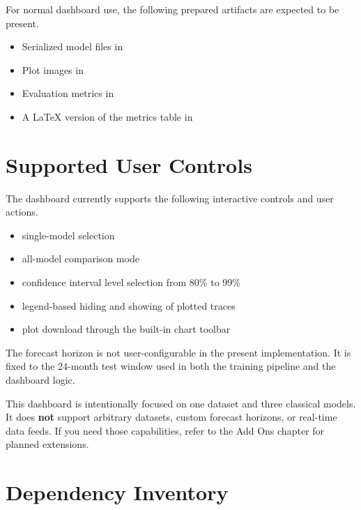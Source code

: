 For normal dashboard use, the following prepared artifacts are expected to be present.

\begin{itemize}
    \item Serialized model files in 
    \item Plot images in 
    \item Evaluation metrics in 
    \item A LaTeX version of the metrics table in 
\end{itemize}

\section{Supported User Controls}

The dashboard currently supports the following interactive controls and user actions.

\begin{itemize}
    \item single-model selection
    \item all-model comparison mode
    \item confidence interval level selection from 80\% to 99\%
    \item legend-based hiding and showing of plotted traces
    \item plot download through the built-in chart toolbar
\end{itemize}

The forecast horizon is not user-configurable in the present implementation. It is fixed to the 24-month test window used in both the training pipeline and the dashboard logic.

\begin{tcolorbox}[colback=blue!5!white, colframe=blue!75!black, title=Scope Reminder]
This dashboard is intentionally focused on one dataset and three classical models. It does \textbf{not} support arbitrary datasets, custom forecast horizons, or real-time data feeds. If you need those capabilities, refer to the Add Ons chapter for planned extensions.
\end{tcolorbox}

\section{Dependency Inventory}

